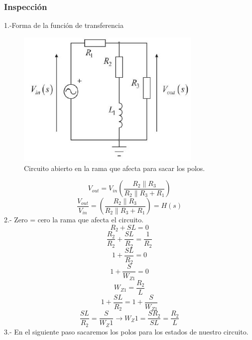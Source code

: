 \documentclass[12pt]{report}
\begin{document}
\subsubsection{Inspección}
1.-Forma de la función de transferencia 
\begin{figure}[h!]
  \centering
    \includegraphics[width=3.5in]{parte1}
  \caption{Circuito abierto en la rama que afecta  para sacar los polos.}
\end{figure}
\begin{equation}
V_{out}=V_{in}(\frac{R_2 \parallel R_3}{R_2 \parallel R_3+R_1})
\end{equation}
\begin{equation*}
\frac{ V_{out}}{V_{in}}=(\frac{R_2 \parallel R_3}{R_2 \parallel R_3+R_1})=H(s)
\end{equation*}
2.- Zero = cero la rama que afecta el circuito.
\begin{equation*}
R_2+SL=0
\end{equation*}
\begin{equation*}
\frac{R_2}{R_2}+\frac{SL}{R_2}=\frac{1}{R_2}
\end{equation*}
\begin{equation*}
1+\frac{SL}{R_2}=0
\end{equation*}
\begin{equation*}
1+\frac{S}{W_{Z1}}=0
\end{equation*}
\begin{equation*}
W_{Z1}=\frac{R_2}{L}
\end{equation*}
\begin{equation*}
1+\frac{SL}{R_2}=1+\frac{S}{W_{Z1}}
\end{equation*}
\begin{equation*}
\frac{SL}{R_2}=\frac{S}{W_Z1} \rightarrow  W_Z1=\frac{SR_2}{SL}=\frac{R_2}{L}
\end{equation*}
3.- En el siguiente paso sacaremos los polos para los estados de nuestro circuito.  
\end{document}

